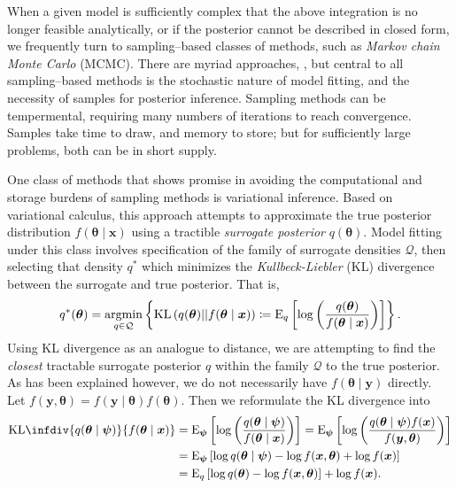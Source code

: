 When a given model is sufficiently complex that the above integration is no
    longer feasible analytically, or if the posterior cannot be described in
    closed form, we frequently 
    turn to sampling--based classes of methods, such as 
    \emph{Markov chain Monte Carlo} (MCMC)\needcite. There are myriad approaches, 
    , but central to all sampling--based 
    methods is the stochastic nature of model fitting, and the 
    necessity of samples for posterior inference.  Sampling methods can be 
    tempermental, requiring many numbers of iterations to reach convergence.
    Samples take time to draw, and memory to store; but for sufficiently large 
    problems, both can be in short supply.

One class of methods that shows promise in avoiding the computational and 
    storage burdens of sampling methods is variational inference.\needcite 
    Based on variational calculus, this approach attempts to approximate the 
    true posterior distribution
    $f(\bm{\theta}\mid\bm{x})$ using a tractible \emph{surrogate posterior} 
    $q(\bm{\theta})$.  Model fitting under this class involves specification of 
    the family of surrogate densities $\mathcal{Q}$, then selecting that density 
    $q^*$ which minimizes the \emph{Kullbeck-Liebler} (KL) divergence between 
    the surrogate and true posterior.  That is,
    \begin{equation}
        \label{eqn:optimalq}
        q^*(\bm{\theta}) = \operatorname*{argmin}_{q\in\mathcal{Q}}\left\lbrace
        \text{KL}\left(q(\bm{\theta})||f(\bm{\theta}\mid\bm{x})\right) 
        \coloneqq
        \text{E}_{q}\left[\log\left(
        \frac{q(\bm{\theta})}{f(\bm{\theta}\mid\bm{x})}
        \right)\right]
        \right\rbrace.
    \end{equation}
    Using KL divergence as an analogue to distance, we are attempting to find
    the \emph{closest} tractable surrogate posterior $q$ within the family 
    $\mathcal{Q}$ to the true posterior.  
    As has been explained however, we do not necessarily have 
    $f(\bm{\theta}\mid\bm{y})$ directly.  Let 
    $f(\bm{y},\bm{\theta}) = f(\bm{y}\mid\bm{\theta})f(\bm{\theta})$.
    Then we reformulate the KL divergence into
    \[
        \begin{aligned}
        \text{KL}\infdiv{q(\bm{\theta}\mid\bm{\psi})}{f(\bm{\theta}\mid\bm{x})}
            &=\text{E}_{\bm{\psi}}\left[\log\left(
                \frac{q(\bm{\theta}\mid\bm{\psi})}{f(\bm{\theta}\mid\bm{x})}
                \right)\right] = \text{E}_{\bm{\psi}}\left[
                \log\left(\frac{q(\bm{\theta}\mid\bm{\psi})f(\bm{x})}{f(\bm{y},\bm{\theta})}
                \right)\right]\\
            &= \text{E}_{\bm{\psi}}\left[
                \log q(\bm{\theta}\mid\bm{\psi}) - \log f(\bm{x},\bm{\theta}) 
                + \log f(\bm{x})
                \right]\\
            &= \text{E}_{q}\left[
                \log q(\bm{\theta}) - \log f(\bm{x},\bm{\theta})\right] + 
                   \log f(\bm{x}).
        \end{aligned}
    \]
